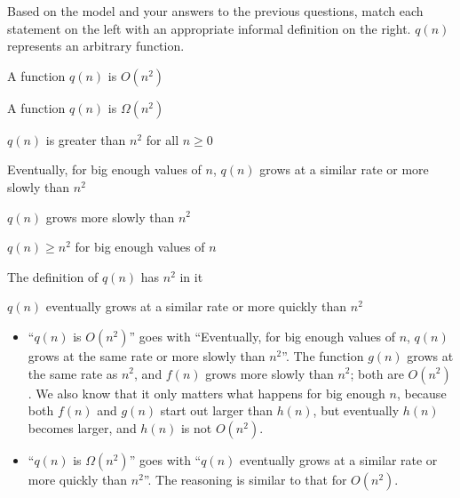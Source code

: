 \documentclass{tufte-handout}
\begin{document}
\begin{questions}
\newpage
\item \label{q:synthesize} Based on the model and your answers to the
  previous questions, match each statement on the left with an
  appropriate informal definition on the right. $q(n)$ represents an
  arbitrary function.  \bigskip

  \begin{fullwidth}
  \begin{center}
  \begin{minipage}{0.4\linewidth}
    A function $q(n)$ is $O(n^2)$ \bigskip

    A function $q(n)$ is $\Omega(n^2)$
  \end{minipage}
  \begin{minipage}{0.4\linewidth}
     $q(n)$ is greater than $n^2$ for all $n \geq 0$ \bigskip

     Eventually, for big enough values of $n$, $q(n)$ grows at
      a similar rate or more slowly than $n^2$ \bigskip

     $q(n)$ grows more slowly than $n^2$ \bigskip

     $q(n) \geq n^2$ for big enough values of $n$ \bigskip

     The definition of $q(n)$ has $n^2$ in it \bigskip

    $q(n)$ eventually grows at a similar rate or more quickly
      than $n^2$
  \end{minipage}
  \end{center}
  \end{fullwidth}

  \begin{answer}
    \begin{itemize}
    \item ``$q(n)$ is $O(n^2)$'' goes with ``Eventually, for big enough
      values of $n$, $q(n)$ grows at the same rate or more slowly than
      $n^2$''.  The function $g(n)$ grows at the same rate as $n^2$,
      and $f(n)$ grows more slowly than $n^2$; both are $O(n^2)$.  We
      also know that it only matters what happens for big enough $n$,
      because both $f(n)$ and $g(n)$ start out larger than $h(n)$, but
      eventually $h(n)$ becomes larger, and $h(n)$ is not $O(n^2)$.
    \item ``$q(n)$ is $\Omega(n^2)$'' goes with ``$q(n)$ eventually
      grows at a similar rate or more quickly than $n^2$''.  The
      reasoning is similar to that for $O(n^2)$.
    \end{itemize}
  \end{answer}


\end{questions}
\end{document}
